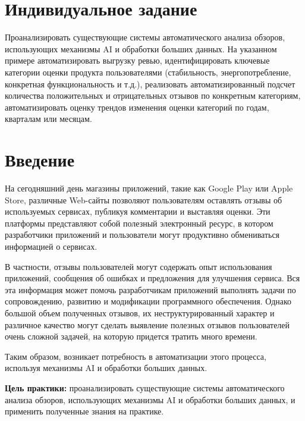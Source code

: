 \documentclass[a4paper,12pt]{article}
\begin{document}
	\pagestyle{empty} %
	
	\newpage
	
	\section*{Индивидуальное задание}
	
	Проанализировать существующие системы автоматического анализа обзоров, использующих механизмы AI  и обработки больших данных. На указанном примере автоматизировать выгрузку ревью, идентифицировать ключевые категории оценки продукта пользователями (стабильность, энергопотребление, конкретная функциональность и т.д.), реализовать автоматизированный подсчет количества положительных и отрицательных отзывов по конкретным категориям, автоматизировать оценку трендов изменения оценки категорий по годам, кварталам или месяцам.
	
	\newpage
	
	\tableofcontents
	
	\newpage
	
	\section*{Введение}
	
	На сегодняшний день магазины приложений, такие как Google Play или Apple Store, различные Web-сайты позволяют пользователям оставлять отзывы об используемых сервисах, публикуя комментарии и выставляя оценки. Эти платформы представляют собой полезный электронный ресурс,
	в котором разработчики приложений и пользователи могут продуктивно обмениваться информацией о сервисах. 
	
	В частности, отзывы пользователей могут содержать опыт использования приложений, сообщения об ошибках и предложения для улучшения сервиса. Вся эта информация может помочь разработчикам приложений выполнять задачи по сопровождению, развитию и модификации программного обеспечения. Однако большой объем полученных отзывов, их неструктурированный характер и различное качество могут сделать выявление полезных отзывов пользователей очень сложной задачей, на которую придется тратить много времени.
	
	Таким образом, возникает потребность в автоматизации этого процесса, используя механизмы AI и обработки больших данных.
	
	\textbf{Цель практики:} проанализировать существующие системы автоматического анализа обзоров, использующих механизмы AI и обработки больших данных, и применить полученные знания на практике.
	
\end{document}
